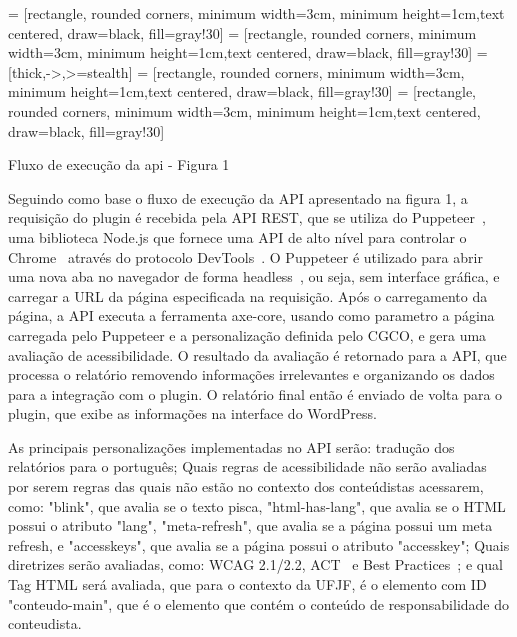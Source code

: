\documentclass[
	article,			%
	12pt,				%
	oneside,			%
	a4paper,			%
	section=TITLE,		%
	subsection=TITLE,	%
	english,			%
	brazil,				%
	sumario=tradicional
	]{abntex2}
\begin{document}
 = [rectangle, rounded corners, minimum width=3cm,
minimum height=1cm,text centered, draw=black, fill=gray!30]
 = [rectangle, rounded corners, minimum width=3cm,
minimum height=1cm,text centered, draw=black, fill=gray!30]
 = [thick,->,>=stealth]
 = [rectangle, rounded corners, minimum width=3cm,
minimum height=1cm,text centered, draw=black, fill=gray!30]
 = [rectangle, rounded corners, minimum width=3cm,
minimum height=1cm,text centered, draw=black, fill=gray!30]

Fluxo de execução da api - Figura 1
\bigbreak

Seguindo como base o fluxo de execução da API apresentado na figura 1,
a requisição do plugin é recebida pela API REST, que se utiliza
do Puppeteer~\cite{puppeteer}, uma biblioteca Node.js que fornece uma
API de alto nível para controlar o Chrome~\cite{chrome} através do protocolo
DevTools~\cite{devtools}. O Puppeteer é utilizado para abrir uma nova aba no navegador de forma
headless~\cite{headless}, ou seja, sem interface gráfica, e carregar a URL da página
especificada na requisição. Após o carregamento da página, a API
executa a ferramenta axe-core, usando como parametro a página carregada
pelo Puppeteer e a personalização definida pelo CGCO, e gera uma avaliação
de acessibilidade. O resultado da avaliação é retornado para a API, que
processa o relatório removendo informações irrelevantes e organizando os dados
para a integração com o plugin. O relatório final então é enviado de
volta para o plugin, que exibe as informações na interface do WordPress.

As principais personalizações implementadas no API serão:
tradução dos relatórios para o português; Quais regras de acessibilidade
não serão avaliadas por serem regras das quais não estão no contexto dos conteúdistas acessarem, como: "blink", que avalia se o texto pisca,
"html-has-lang", que avalia se o HTML possui o atributo
"lang", "meta-refresh", que avalia se a página possui um meta refresh, e
"accesskeys", que avalia se a página possui o atributo "accesskey"; Quais
diretrizes serão avaliadas, como: WCAG 2.1/2.2, ACT~\cite{ACT} e Best
Practices~\cite{BP}; e qual
Tag HTML será avaliada, que para o contexto da UFJF, é o elemento com ID "conteudo-main",
que é o elemento que contém o conteúdo de responsabilidade do conteudista.
\end{document}
